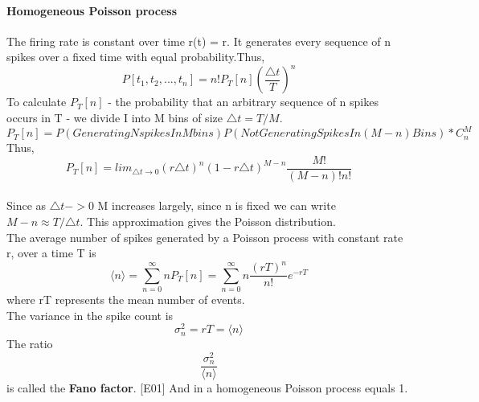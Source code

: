 \documentclass{report}
\begin{document}
\paragraph{Homogeneous Poisson process} The firing rate is constant over time r(t) = r. It generates every sequence of n spikes over a fixed time with equal probability.Thus, 
\begin{equation}
P[t_{1},t_{2}, ..., t_{n}] = n!P_{T}[n](\frac{\triangle t}{T})^{n}
\end{equation}
To calculate $P_{T}[n]$ - the probability that an arbitrary sequence of n spikes occurs in T - we divide I into M bins of size $\triangle t= T/M$.
\begin{equation}
P_{T}[n] = P(Generating N spikes In M bins)P(Not Generating Spikes In (M-n) Bins)*C_{n}^{M}
\end{equation}
Thus,
\begin{equation}
P_{T}[n] = lim_{\triangle t\to0}(r\triangle t)^{n}(1-r\triangle t)^{M-n}\frac{M!}{(M-n)!n!}
\end{equation}
\\Since as $\triangle t -> 0$ M increases largely, since n is fixed we can write $M -n \approx T/\triangle t$. This approximation gives the Poisson distribution. 
\\The average number of spikes generated by a Poisson process with constant rate r, over a time T is 
\begin{equation}
\langle n \rangle = \sum_{n=0}^{\infty}nP_{T}[n] = \sum_{n=0}^{\infty}n\frac{(rT)^{n}}{n!}e^{-rT}
\end{equation}
where rT represents the mean number of events.
\\The variance in the spike count is 
\begin{equation}
\sigma_{n}^{2}=rT = \langle n \rangle
\end{equation}
The ratio 
\begin{equation}
\frac{\sigma_{n}^{2}}{\langle n \rangle}
\end{equation}
is called the \textbf{Fano factor}. {\color{blue} [E01]} And in a homogeneous Poisson process equals 1.
\end{document}
